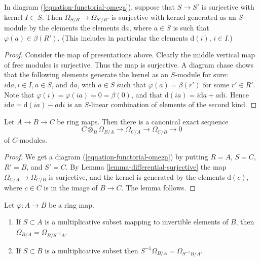 \begin{lemma}
\label{lemma-differential-surjective}
In diagram (\ref{equation-functorial-omega}), suppose
that $S \to S'$ is surjective with kernel $I \subset S$.
Then $\Omega_{S/R} \to \Omega_{S'/R'}$ is surjective with
kernel generated as an $S$-module by the elements the elements
$\text{d}a$, where $a \in S$ is such that $\varphi(a) \in \beta(R')$.
(This includes in particular the elements $\text{d}(i)$, $i \in I$.)
\end{lemma}

\begin{proof}
Consider the map of presentations above. Clearly the middle vertical
map of free modules is surjective. Thus the map is surjective.
A diagram chase shows that the following elements generate
the kernel as an $S$-module for sure: $i\text{d}a, i\in I, a \in S$,
and $\text{d}a$, with $a \in S$ such that
$\varphi(a) = \beta(r')$ for some $r' \in R'$.
Note that $\varphi(i) = \varphi(ia) = 0 = \beta(0)$, and that
$\text{d}(ia) = i\text{d}a + a \text{d}i$.
Hence $i\text{d}a = \text{d}(ia) - a \text{d}i$ is
an $S$-linear combination of elements of the second kind.
\end{proof}

\begin{lemma}
\label{lemma-exact-sequence-differentials}
Let $A \to B \to C$ be ring maps.
Then there is a canonical exact sequence
$$
C \otimes_B \Omega_{B/A} \to
\Omega_{C/A} \to
\Omega_{C/B} \to 0
$$
of $C$-modules.
\end{lemma}

\begin{proof}
We get a diagram (\ref{equation-functorial-omega}) by putting
$R = A$, $S = C$, $R' = B$, and $S' = C$.
By Lemma \ref{lemma-differential-surjective} the map
$\Omega_{C/A} \to \Omega_{C/B}$ is surjective, and the kernel
is generated by the elements $\text{d}(c)$, where $c \in C$
is in the image of $B \to C$. The lemma follows.
\end{proof}

\begin{lemma}
\label{lemma-differentials-localize}
Let $\varphi : A \to B$ be a ring map.
\begin{enumerate}
\item If $S \subset A$ is a multiplicative subset mapping to
invertible elements of $B$, then $\Omega_{B/A} = \Omega_{B/S^{-1}A}$.
\item If $S \subset B$ is a multiplicative subset then
$S^{-1}\Omega_{B/A} = \Omega_{S^{-1}B/A}$.
\end{enumerate}
\end{lemma}

